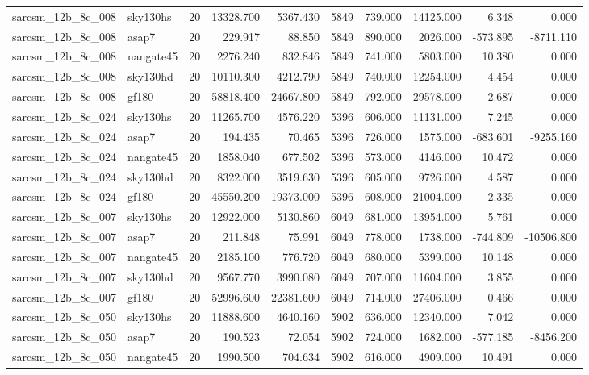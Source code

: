 \begin{tabular}{llrrrrrrrr}
sarcsm\_12b\_8c\_008 & sky130hs & 20 & 13328.700 & 5367.430 & 5849 & 739.000 & 14125.000 & 6.348 & 0.000 \\
sarcsm\_12b\_8c\_008 & asap7 & 20 & 229.917 & 88.850 & 5849 & 890.000 & 2026.000 & -573.895 & -8711.110 \\
sarcsm\_12b\_8c\_008 & nangate45 & 20 & 2276.240 & 832.846 & 5849 & 741.000 & 5803.000 & 10.380 & 0.000 \\
sarcsm\_12b\_8c\_008 & sky130hd & 20 & 10110.300 & 4212.790 & 5849 & 740.000 & 12254.000 & 4.454 & 0.000 \\
sarcsm\_12b\_8c\_008 & gf180 & 20 & 58818.400 & 24667.800 & 5849 & 792.000 & 29578.000 & 2.687 & 0.000 \\
sarcsm\_12b\_8c\_024 & sky130hs & 20 & 11265.700 & 4576.220 & 5396 & 606.000 & 11131.000 & 7.245 & 0.000 \\
sarcsm\_12b\_8c\_024 & asap7 & 20 & 194.435 & 70.465 & 5396 & 726.000 & 1575.000 & -683.601 & -9255.160 \\
sarcsm\_12b\_8c\_024 & nangate45 & 20 & 1858.040 & 677.502 & 5396 & 573.000 & 4146.000 & 10.472 & 0.000 \\
sarcsm\_12b\_8c\_024 & sky130hd & 20 & 8322.000 & 3519.630 & 5396 & 605.000 & 9726.000 & 4.587 & 0.000 \\
sarcsm\_12b\_8c\_024 & gf180 & 20 & 45550.200 & 19373.000 & 5396 & 608.000 & 21004.000 & 2.335 & 0.000 \\
sarcsm\_12b\_8c\_007 & sky130hs & 20 & 12922.000 & 5130.860 & 6049 & 681.000 & 13954.000 & 5.761 & 0.000 \\
sarcsm\_12b\_8c\_007 & asap7 & 20 & 211.848 & 75.991 & 6049 & 778.000 & 1738.000 & -744.809 & -10506.800 \\
sarcsm\_12b\_8c\_007 & nangate45 & 20 & 2185.100 & 776.720 & 6049 & 680.000 & 5399.000 & 10.148 & 0.000 \\
sarcsm\_12b\_8c\_007 & sky130hd & 20 & 9567.770 & 3990.080 & 6049 & 707.000 & 11604.000 & 3.855 & 0.000 \\
sarcsm\_12b\_8c\_007 & gf180 & 20 & 52996.600 & 22381.600 & 6049 & 714.000 & 27406.000 & 0.466 & 0.000 \\
sarcsm\_12b\_8c\_050 & sky130hs & 20 & 11888.600 & 4640.160 & 5902 & 636.000 & 12340.000 & 7.042 & 0.000 \\
sarcsm\_12b\_8c\_050 & asap7 & 20 & 190.523 & 72.054 & 5902 & 724.000 & 1682.000 & -577.185 & -8456.200 \\
sarcsm\_12b\_8c\_050 & nangate45 & 20 & 1990.500 & 704.634 & 5902 & 616.000 & 4909.000 & 10.491 & 0.000 \\

\end{tabular}
